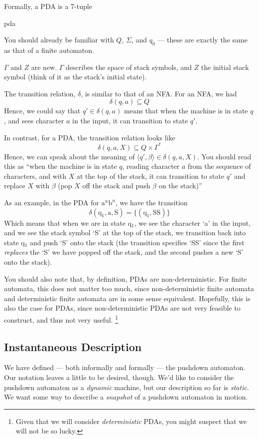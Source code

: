 Formally, a PDA is a 7-tuple
\begin{center}
    {pda}
\end{center}

You should already be familiar with $Q$, $\Sigma$, and $q_0$ --- these are exactly the same as that of a finite automaton.

$\Gamma$ and $Z$ are new. $\Gamma$ describes the space of stack symbols, and $Z$ the initial stack symbol (think of it as the stack's initial state).

The transition relation, $\delta$, is similar to that of an NFA. For an NFA, we had
\[\delta(q, a) \subseteq Q\]
Hence, we could say that $q' \in \delta(q, a)$ means that when the machine is in state $q$, and sees character $a$ in the input, it can transition to state $q'$.

In contrast, for a PDA, the transition relation looks like
\[\delta(q, a, X) \subseteq Q \times \Gamma^{*}\]
Hence, we can speak about the meaning of $\langle q', \beta \rangle \in \delta(q, a, X)$. You should read this as ``when the machine is in state $q$, reading character $a$ from the sequence of characters, and with $X$ at the top of the stack, it can transition to state $q'$ and replace $X$ with $\beta$ (pop $X$ off the stack and push $\beta$ on the stack)''

As an example, in the PDA for $\text{a}^n\text{b}^n$, we have the transition
\[\delta(\text{q}_1, \text{a}, \text{S}) = \{(\text{q}_1, \text{SS})\}\]
Which means that when we are in state q$_1$, we see the character `a' in the input, and we see the stack symbol `S' at the top of the stack, we transition back into state q$_1$ and push `S' onto the stack (the transition specifies `SS' since the first \textit{replaces} the `S' we have popped off the stack, and the second pushes a new `S' onto the stack).

You should also note that, by definition, PDAs are non-deterministic. For finite automata, this does not matter too much, since non-deterministic finite automata and deterministic finite automata are in some sense equivalent. Hopefully, this is also the case for PDAs, since non-deterministic PDAs are not very feasible to construct, and thus not very useful. \footnote{Given that we will consider \textit{deterministic} PDAs, you might suspect that we will not be so lucky.}

\subsection{Instantaneous Description}
We have defined --- both informally and formally --- the pushdown automaton. Our notation leaves a little to be desired, though. We'd like to consider the pushdown automaton as a \textit{dynamic} machine, but our description so far is \textit{static}. We want some way to describe a \textit{snapshot} of a pushdown automaton in motion. 

